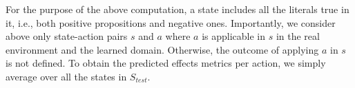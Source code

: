 \documentclass{article}
\theoremstyle{definition}
\theoremstyle{remark}
\newcommand{\stest}{\ensuremath{S_{\textit{test}}}\xspace}
\newcommand{\realm}{{\ensuremath{M^*}}\xspace}
\newcommand{\eff}{\ensuremath{\textit{eff}}\xspace}
\newif\ifaddcomments
\newcommand{\roni}[1]{\ifaddcomments{\textcolor{red}{[Roni: #1]}}\fi}
\newcommand{\argaman}[1]{\ifaddcomments{\textcolor{blue}{[Argaman: #1]}}\fi}
\newcommand{\gregor}[1]{\ifaddcomments{\textcolor{orange}{[Gregor: #1]}}\fi}
\newcommand{\cm}[1]{\ifaddcomments{\textcolor{olive}{[Christian: #1]}}\fi}
\newcommand{\leo}[1]{\ifaddcomments{\textcolor{pink}{[Leonardo: #1]}}\fi}
\begin{document}
For the purpose of the above computation, a state includes all the literals true in it, i.e., both positive propositions and negative ones. 
Importantly, we consider above only state-action pairs $s$ and $a$ where $a$ is applicable in $s$ in the real environment and the learned domain. 
Otherwise, the outcome of applying $a$ in $s$ is not defined. 
To obtain the predicted effects metrics per action, we simply average over all the states in $\stest$. 
\argaman{Notice, similar to the predicted applicability metric, when $TP_{\eff}(a)=FP_{\eff}(a)=0$, we define $P_{\eff}(a)$ and $R_{\eff}(a)$ to be one and zero, respectively. This reflects there were no states in which the action was applicable, resulting in it not changing any of the states in which it was 'applied' on.}
\leo{I am not sure, for example when an action is never applicable then is not considered by the predicted effects metric, i.e. there is no TP and FP}
\end{document}
